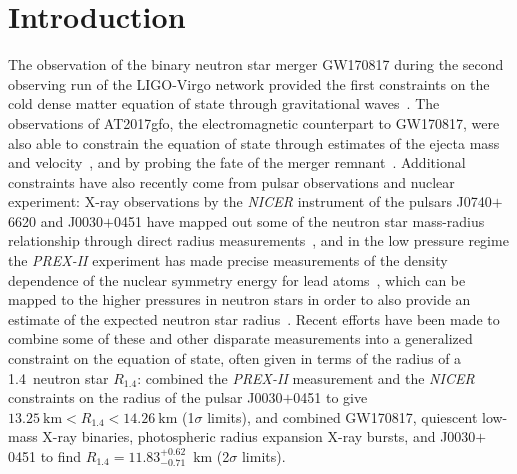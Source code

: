 \section{Introduction}
The observation of the binary neutron star merger GW170817 during the second observing run of the LIGO-Virgo network provided the first constraints on the cold dense matter equation of state through gravitational waves~\cite{LIGOScientific:2017vwq}. The observations of AT2017gfo, the electromagnetic counterpart to GW170817, were also able to constrain the equation of state through estimates of the ejecta mass and velocity~\cite{Radice:2018ozg}, and by probing the fate of the merger remnant~\cite{Margalit:2019dpi}. Additional constraints have also recently come from pulsar observations and nuclear experiment: X-ray observations by the \textit{NICER} instrument of the pulsars J0740$+$6620 and J0030$+$0451 have mapped out some of the neutron star mass-radius relationship through direct radius measurements~\cite{Riley:2019yda,Riley:2021pdl,Miller:2021qha}, and in the low pressure regime the \textit{PREX-II} experiment has made precise measurements of the density dependence of the nuclear symmetry energy for lead atoms~\cite{PREX:2021umo}, which can be mapped to the higher pressures in neutron stars in order to also provide an estimate of the expected neutron star radius~\cite{Reed:2021nqk}. Recent efforts have been made to combine some of these and other disparate measurements into a generalized constraint on the equation of state, often given in terms of the radius of a 1.4\msun~neutron star $R_{1.4}$: \cite{Reed:2021nqk} combined the \textit{PREX-II} measurement and the \textit{NICER} constraints on the radius of the pulsar J0030$+$0451 to give $13.25~\mathrm{km}<R_{1.4}<14.26~\mathrm{km}$ (1$\sigma$ limits), and \cite{Al-Mamun:2020vzu} combined GW170817, quiescent low-mass X-ray binaries, photospheric radius expansion X-ray bursts, and J0030$+$0451 to find $R_{1.4}=11.83_{-0.71}^{+0.62}$~km (2$\sigma$ limits).

